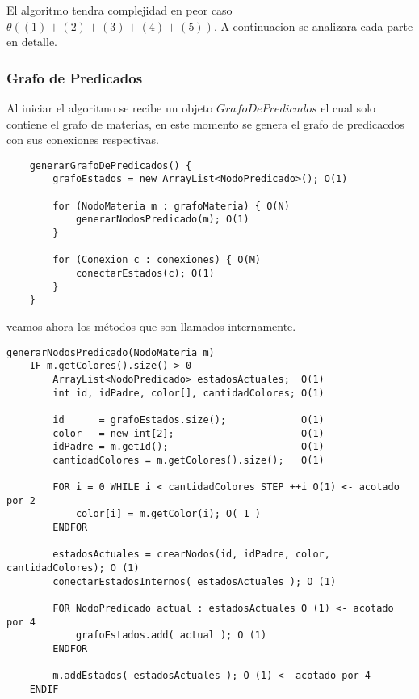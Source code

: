 El algoritmo tendra complejidad en peor caso $\theta((1) + (2) + (3) + (4) + (5))$. A continuacion se analizara cada parte en detalle. \\

\subsubsection {Grafo de Predicados}

Al iniciar el algoritmo se recibe un objeto $GrafoDePredicados$ el cual solo contiene el grafo de materias, en este momento se genera el grafo de predicacdos con sus conexiones respectivas.

\begin{verbatim}
    generarGrafoDePredicados() {
        grafoEstados = new ArrayList<NodoPredicado>(); O(1)
		
        for (NodoMateria m : grafoMateria) { O(N)
            generarNodosPredicado(m); O(1)
        }

        for (Conexion c : conexiones) { O(M)
            conectarEstados(c); O(1)
        }
    }
\end{verbatim}

veamos ahora los m\'etodos que son llamados internamente.\\

\begin{verbatim}
generarNodosPredicado(NodoMateria m)
    IF m.getColores().size() > 0
        ArrayList<NodoPredicado> estadosActuales;  O(1)
        int id, idPadre, color[], cantidadColores; O(1)
		
        id 		= grafoEstados.size();             O(1)
        color 	= new int[2];                      O(1)
        idPadre = m.getId();                       O(1)
        cantidadColores = m.getColores().size();   O(1)
		
        FOR i = 0 WHILE i < cantidadColores STEP ++i O(1) <- acotado por 2
            color[i] = m.getColor(i); O( 1 )
        ENDFOR
		
        estadosActuales = crearNodos(id, idPadre, color, cantidadColores); O (1)
        conectarEstadosInternos( estadosActuales ); O (1)

        FOR NodoPredicado actual : estadosActuales O (1) <- acotado por 4
            grafoEstados.add( actual ); O (1)
        ENDFOR
        
        m.addEstados( estadosActuales ); O (1) <- acotado por 4
    ENDIF
\end{verbatim}

